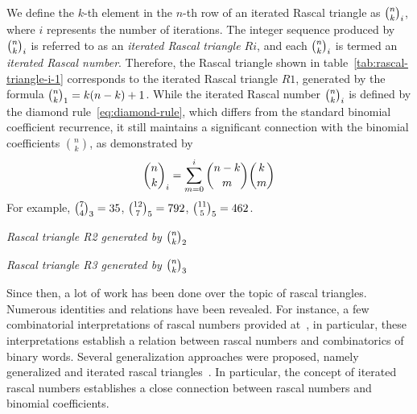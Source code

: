 We define the $k$-th element in the $n$-th row of an iterated Rascal triangle as $\binom{n}{k}_{i}$,
where $i$ represents the number of iterations.
The integer sequence produced by $\binom{n}{k}_{i}$ is referred to as an \textit{iterated Rascal triangle $Ri$},
and each $\binom{n}{k}_{i}$ is termed an \textit{iterated Rascal number}.
Therefore, the Rascal triangle shown in table~\eqref{tab:rascal-triangle-i-1} corresponds
to the iterated Rascal triangle $R1$, generated by the formula $\binom{n}{k}_{1} = k(n-k)+1$.
While the iterated Rascal number $\binom{n}{k}_{i}$ is defined by the diamond rule~\eqref{eq:diamond-rule},
which differs from the standard binomial coefficient recurrence,
it still maintains a significant connection with the binomial coefficients $\binom{n}{k}$,
as demonstrated by
\begin{equation}
    \binom{n}{k}_{i} = \sum_{m=0}^{i} \binom{n-k}{m} \binom{k}{m}
    \label{eq:iterated-rascal-number}
\end{equation}
For example, $\binom{7}{4}_{3}=35$, $\binom{12}{7}_{5}=792$, $\binom{11}{5}_{5}=462$.
\begin{examp}
    \emph{
        Rascal triangle R2 generated by $\binom{n}{k}_{2}$
        }
\end{examp}
\begin{examp}
    \emph{
        Rascal triangle R3 generated by $\binom{n}{k}_{3}$
        }
\end{examp}


Since then, a lot of work has been done over the topic of rascal triangles.
Numerous identities and relations have been revealed.
For instance, a few combinatorial interpretations of rascal numbers provided at~\cite{gibbs2024two}, in particular,
these interpretations establish a relation between rascal numbers and combinatorics of binary words.
Several generalization approaches were proposed, namely generalized
and iterated rascal triangles~\cite{hotchkiss2019generalized,gregory2023iterated}.
In particular, the concept of iterated rascal numbers establishes a close connection between rascal numbers and binomial
coefficients.
